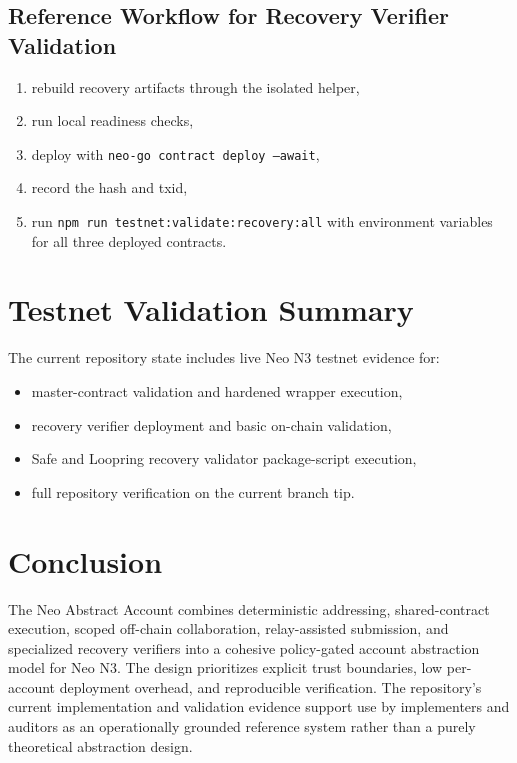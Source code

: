 \documentclass[11pt]{article}
\newcommand{\code}[1]{\texttt{#1}}
\newcommand{\aasystem}{Neo Abstract Account}
\begin{document}
\subsection{Reference Workflow for Recovery Verifier Validation}
\begin{enumerate}
  \item rebuild recovery artifacts through the isolated helper,
  \item run local readiness checks,
  \item deploy with \code{neo-go contract deploy --await},
  \item record the hash and txid,
  \item run \code{npm run testnet:validate:recovery:all} with environment variables for all three deployed contracts.
\end{enumerate}

\section{Testnet Validation Summary}
The current repository state includes live Neo N3 testnet evidence for:
\begin{itemize}
  \item master-contract validation and hardened wrapper execution,
  \item recovery verifier deployment and basic on-chain validation,
  \item Safe and Loopring recovery validator package-script execution,
  \item full repository verification on the current branch tip.
\end{itemize}

\section{Conclusion}
The \aasystem{} combines deterministic addressing, shared-contract execution, scoped off-chain collaboration, relay-assisted submission, and specialized recovery verifiers into a cohesive policy-gated account abstraction model for Neo N3. The design prioritizes explicit trust boundaries, low per-account deployment overhead, and reproducible verification. The repository's current implementation and validation evidence support use by implementers and auditors as an operationally grounded reference system rather than a purely theoretical abstraction design.

\appendix
\end{document}
